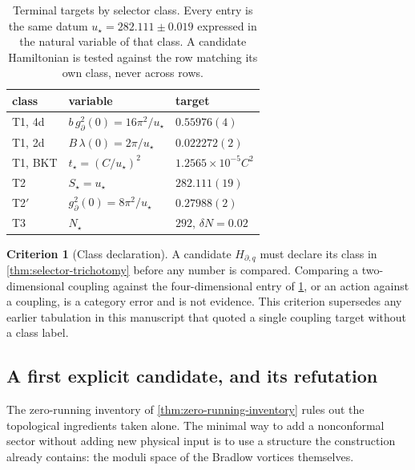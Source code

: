 \documentclass[aps,prd,reprint,nofootinbib,superscriptaddress,floatfix]{revtex4-2}
\numberwithin{equation}{section}
\theoremstyle{definition}
\newtheorem{criterion}{Criterion}[section]
\theoremstyle{plain}
\begin{document}
\begin{table}[t]
\caption{Terminal targets by selector class.  Every entry is the same datum
\(u_\star=282.111\pm0.019\) expressed in the natural variable of that class.
A candidate Hamiltonian is tested against the row matching its own class,
never across rows.}
\label{tab:class-targets}
\begin{ruledtabular}
\begin{tabular}{lll}
class & variable & target\\
\hline
T1, 4d & \(b\,g_\partial^2(0)=16\pi^2/u_\star\) & \(0.55976(4)\)\\
T1, 2d & \(B\,\lambda(0)=2\pi/u_\star\) & \(0.022272(2)\)\\
T1, BKT & \(t_\star=(C/u_\star)^2\) & \(1.2565\times10^{-5}C^2\)\\
T2 & \(S_\star=u_\star\) & \(282.111(19)\)\\
T2\('\) & \(g_\partial^2(0)=8\pi^2/u_\star\) & \(0.27988(2)\)\\
T3 & \(N_\star\) & \(292\), \(\delta N=0.02\)\\
\end{tabular}
\end{ruledtabular}
\end{table}

\begin{criterion}[Class declaration]
\label{crit:class-declaration}
A candidate \(H_{\partial,q}\) must declare its class in
\cref{thm:selector-trichotomy} before any number is compared.  Comparing a
two-dimensional coupling against the four-dimensional entry of
\cref{tab:class-targets}, or an action against a coupling, is a category
error and is not evidence.  This criterion supersedes any earlier tabulation
in this manuscript that quoted a single coupling target without a class
label.
\end{criterion}

\subsection{A first explicit candidate, and its refutation}

The zero-running inventory of \cref{thm:zero-running-inventory} rules out the
topological ingredients taken alone.  The minimal way to add a nonconformal
sector without adding new physical input is to use a structure the
construction already contains: the moduli space of the Bradlow vortices
themselves.
\end{document}
